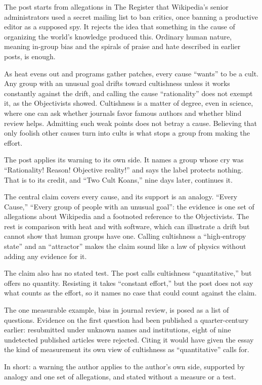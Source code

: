 \begin{afterword}
\summaryhead

The post starts from allegations in The Register that Wikipedia's senior administrators used a secret mailing list to ban critics, once banning a productive editor as a supposed spy. It rejects the idea that something in the cause of organizing the world's knowledge produced this. Ordinary human nature, meaning in-group bias and the spirals of praise and hate described in earlier posts, is enough.

As heat evens out and programs gather patches, every cause ``wants'' to be a cult. Any group with an unusual goal drifts toward cultishness unless it works constantly against the drift, and calling the cause ``rationality'' does not exempt it, as the Objectivists showed. Cultishness is a matter of degree, even in science, where one can ask whether journals favor famous authors and whether blind review helps. Admitting such weak points does not betray a cause. Believing that only foolish other causes turn into cults is what stops a group from making the effort.

\responsehead

The post applies its warning to its own side. It names a group whose cry was ``Rationality! Reason! Objective reality!'' and says the label protects nothing. That is to its credit, and ``Two Cult Koans,'' nine days later, continues it.

The central claim covers every cause, and its support is an analogy. ``Every Cause,'' ``Every group of people with an unusual goal'': the evidence is one set of allegations about Wikipedia and a footnoted reference to the Objectivists. The rest is comparison with heat and with software, which can illustrate a drift but cannot show that human groups have one. Calling cultishness a ``high-entropy state'' and an ``attractor'' makes the claim sound like a law of physics without adding any evidence for it.

The claim also has no stated test. The post calls cultishness ``quantitative,'' but offers no quantity. Resisting it takes ``constant effort,'' but the post does not say what counts as the effort, so it names no case that could count against the claim.

The one measurable example, bias in journal review, is posed as a list of questions. Evidence on the first question had been published a quarter-century earlier: resubmitted under unknown names and institutions, eight of nine undetected published articles were rejected. Citing it would have given the essay the kind of measurement its own view of cultishness as ``quantitative'' calls for.

In short: a warning the author applies to the author's own side, supported by analogy and one set of allegations, and stated without a measure or a test.
\end{afterword}
